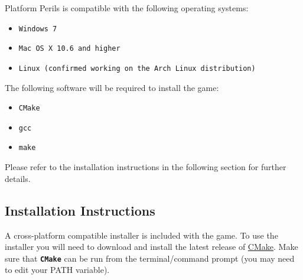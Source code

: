 \documentclass[12pt, titlepage]{article}
\begin{document}
Platform Perils is compatible with the following operating systems:
\begin{itemize}
  \item \texttt{Windows 7}
  \item \texttt{Mac OS X 10.6 and higher}
  \item \texttt{Linux (confirmed working on the Arch Linux distribution)}
\end{itemize}

\noindent The following software will be required to install the game:
\begin{itemize}
  \item \texttt{CMake}
  \item \texttt{gcc}
  \item \texttt{make}
\end{itemize}

\noindent Please refer to the installation instructions in the following section for further details.

\subsection{Installation Instructions}
A cross-platform compatible installer is included with the game.  To use the installer you will need to download and install the latest release of \href{https://cmake.org/}{CMake}.  Make sure that \texttt{\bf CMake} can be run from the terminal/command prompt (you may need to edit your PATH variable).
\end{document}
